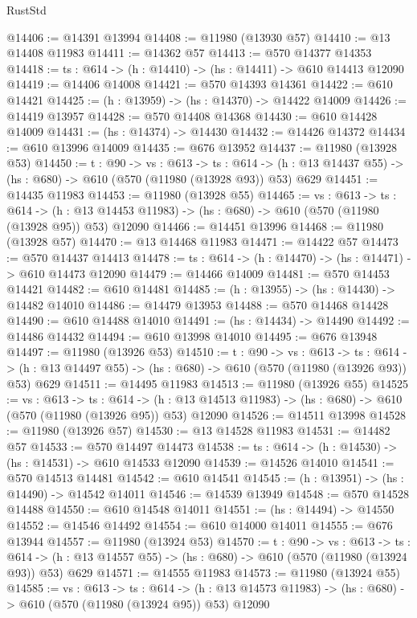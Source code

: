 \begin{lexlean}{RustStd}
\begin{coremodule}
@14406 := @14391 @13994
@14408 := @11980 (@13930 @57)
@14410 := @13 @14408 @11983
@14411 := @14362 @57
@14413 := @570 @14377 @14353
@14418 := {ts : @614} -> (h : @14410) -> (hs : @14411) -> @610 @14413 @12090
@14419 := @14406 @14008
@14421 := @570 @14393 @14361
@14422 := @610 @14421
@14425 := (h : @13959) -> (hs : @14370) -> @14422 @14009
@14426 := @14419 @13957
@14428 := @570 @14408 @14368
@14430 := @610 @14428 @14009
@14431 := (hs : @14374) -> @14430
@14432 := @14426 @14372
@14434 := @610 @13996 @14009
@14435 := @676 @13952
@14437 := @11980 (@13928 @53)
@14450 := {t : @90} ->
  {vs : @613} ->
  {ts : @614} -> (h : @13 @14437 @55) -> (hs : @680) -> @610 (@570 (@11980 (@13928 @93)) @53) @629
@14451 := @14435 @11983
@14453 := @11980 (@13928 @55)
@14465 := {vs : @613} ->
  {ts : @614} ->
  (h : @13 @14453 @11983) -> (hs : @680) -> @610 (@570 (@11980 (@13928 @95)) @53) @12090
@14466 := @14451 @13996
@14468 := @11980 (@13928 @57)
@14470 := @13 @14468 @11983
@14471 := @14422 @57
@14473 := @570 @14437 @14413
@14478 := {ts : @614} -> (h : @14470) -> (hs : @14471) -> @610 @14473 @12090
@14479 := @14466 @14009
@14481 := @570 @14453 @14421
@14482 := @610 @14481
@14485 := (h : @13955) -> (hs : @14430) -> @14482 @14010
@14486 := @14479 @13953
@14488 := @570 @14468 @14428
@14490 := @610 @14488 @14010
@14491 := (hs : @14434) -> @14490
@14492 := @14486 @14432
@14494 := @610 @13998 @14010
@14495 := @676 @13948
@14497 := @11980 (@13926 @53)
@14510 := {t : @90} ->
  {vs : @613} ->
  {ts : @614} -> (h : @13 @14497 @55) -> (hs : @680) -> @610 (@570 (@11980 (@13926 @93)) @53) @629
@14511 := @14495 @11983
@14513 := @11980 (@13926 @55)
@14525 := {vs : @613} ->
  {ts : @614} ->
  (h : @13 @14513 @11983) -> (hs : @680) -> @610 (@570 (@11980 (@13926 @95)) @53) @12090
@14526 := @14511 @13998
@14528 := @11980 (@13926 @57)
@14530 := @13 @14528 @11983
@14531 := @14482 @57
@14533 := @570 @14497 @14473
@14538 := {ts : @614} -> (h : @14530) -> (hs : @14531) -> @610 @14533 @12090
@14539 := @14526 @14010
@14541 := @570 @14513 @14481
@14542 := @610 @14541
@14545 := (h : @13951) -> (hs : @14490) -> @14542 @14011
@14546 := @14539 @13949
@14548 := @570 @14528 @14488
@14550 := @610 @14548 @14011
@14551 := (hs : @14494) -> @14550
@14552 := @14546 @14492
@14554 := @610 @14000 @14011
@14555 := @676 @13944
@14557 := @11980 (@13924 @53)
@14570 := {t : @90} ->
  {vs : @613} ->
  {ts : @614} -> (h : @13 @14557 @55) -> (hs : @680) -> @610 (@570 (@11980 (@13924 @93)) @53) @629
@14571 := @14555 @11983
@14573 := @11980 (@13924 @55)
@14585 := {vs : @613} ->
  {ts : @614} ->
  (h : @13 @14573 @11983) -> (hs : @680) -> @610 (@570 (@11980 (@13924 @95)) @53) @12090

\end{coremodule}
\end{lexlean}
